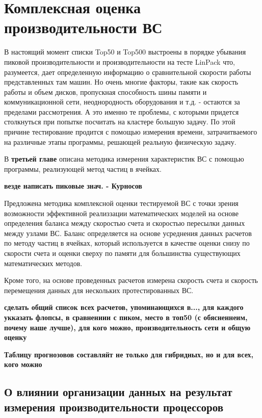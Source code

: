 \chapter{Комплексная оценка производительности ВС}

В настоящий момент списки Top50 и Top500
выстроены в порядке убывания пиковой производительности и производительности на тесте LinPack что, разумеется, дает определенную информацию
о сравнительной скорости работы представленных там машин. Но очень многие факторы, такие как скорость работы и объем дисков, пропускная 
способность шины памяти и коммуникационной сети, неоднородность оборудования и т.д. - остаются за пределами рассмотрения. А это именно те 
проблемы, с которыми придется столкнуться при попытке посчитать на кластере большую задачу. По этой причине тестирование продится с помощью измерения времени, затрачитваемого на различные этапы программы, решающей реальную физическую задачу.

В \textbf{третьей главе} описана методика измерения характеристик ВС с помощью программы, реализующей метод частиц в ячейках.


\textbf{везде написать пиковые знач. - Курносов 
}


Предложена методика комплексной оценки тестируемой ВС с точки зрения возможности эффективной реализзации математических моделей на основе определения баланса между скоростью счета и скоростью пересылки данных между узлами ВС. Баланс определяется на основе усреднения данных расчетов по методу частиц в ячейках, который используется в качестве оценки снизу по скорости счета и оценки сверху по памяти для большинства существующих математических методов.

Кроме того, на основе проведенных расчетов измерена скорость счета и скорость перемещения данных для нескольких протестированных ВС.   

		
\textbf{сделать общий список всех расчетов, упоминающихся в..., для каждого укказать флопсы, в сравнениии с пиком, место в топ50 (с обясненнеим, почему наше лучше), для кого можно, производительность сети и общую оценку}

\textbf{Таблицу прогнозовов составляйт не только для гибридных, но и для всех, кого можно}





\section{О влиянии организации данных на результат измерения производительности процессоров}
\label{procs_influence}

